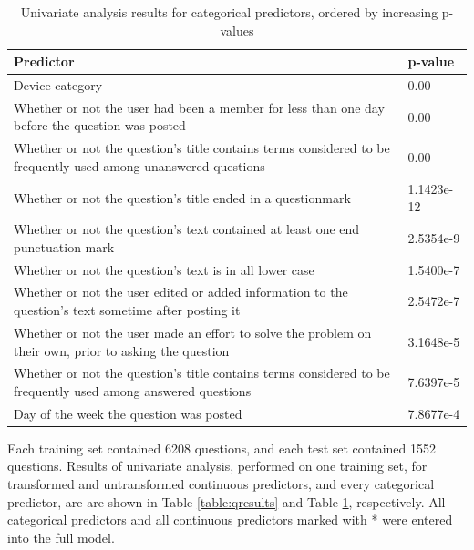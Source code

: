 \documentclass{article}
\begin{document}
\begin{table}[!htbp]
\centering
\caption{Univariate analysis results for categorical predictors, ordered by increasing p-values} 
\begin{tabular}{|p{12cm}|p{2cm}|}
  \hline
 Predictor & p-value \\ 
  \hline \hline
  Device category & 0.00 \\
  \hline
  Whether or not the user had been a member for less than one day before the question was posted & 0.00 \\ 
  \hline
  Whether or not the question's title contains terms considered to be frequently used among unanswered questions & 0.00 \\ 
  \hline
  Whether or not the question's title ended in a questionmark & 1.1423e-12 \\ 
  \hline
  Whether or not the question's text contained at least one end punctuation mark & 2.5354e-9 \\ 
  \hline
  Whether or not the question's text is in all lower case & 1.5400e-7 \\ 
  \hline
  Whether or not the user edited or added information to the question's text sometime after posting it & 2.5472e-7 \\ 
  \hline
  Whether or not the user made an effort to solve the problem on their own, prior to asking the question & 3.1648e-5 \\
  \hline
  Whether or not the question's title contains terms considered to be frequently used among answered questions & 7.6397e-5 \\ 
  \hline
  Day of the week the question was posted & 7.8677e-4 \\ 
   \hline
\end{tabular}
\label{table:cresults}
\end{table}


Each training set contained 6208 questions, and each test set contained 1552 questions. Results of univariate analysis, performed on one training set, for transformed and untransformed continuous predictors, and every categorical predictor, are are shown in Table \ref{table:qresults} and Table \ref{table:cresults}, respectively. All categorical predictors and all continuous predictors marked with * were entered into the full model.
\end{document}
